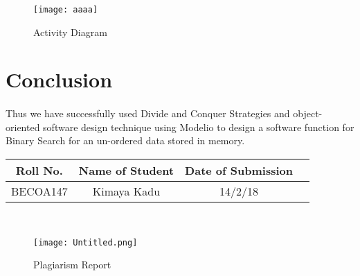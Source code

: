 \documentclass[a4paper,12pt]{article}
\begin{document}
\begin{figure}[htb!]
		
\texttt{[image: aaaa]}
		\centering
		\caption{Activity Diagram}
		\label{Activity Diagram}
		\end{figure}



\section{Conclusion}
	\paragraph{} Thus we have successfully used Divide and Conquer Strategies and object-oriented software design technique using Modelio to design a software function for Binary Search for an un-ordered data stored in memory.
\vspace{20px}


\begin{center}
	\begin{tabular}
		{|c|c|c|c|}\hline
		{\bf Roll No.}		&{\bf  Name of Student}		  				&{\bf Date of Submission}  \\ \hline
		{BECOA147}	&	{Kimaya Kadu}	& {14/2/18}  \\ \hline
	\end{tabular}\\ 
\end{center}
\newpage


\begin{figure}[htb!]
	\centering
	\texttt{[image: Untitled.png]}
	\caption{Plagiarism Report }
	\label{Plagiarism Report}
\end{figure}
\end{document}
